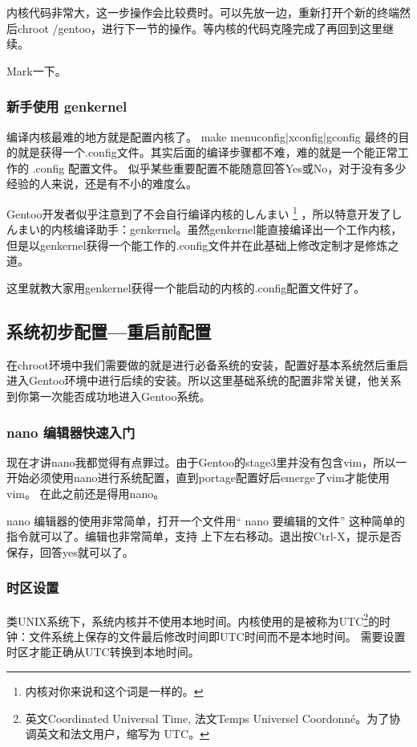 \documentclass[amstex,twoside]{ctexbook}
\begin{document}
内核代码非常大，这一步操作会比较费时。可以先放一边，重新打开个新的终端然后chroot /gentoo，进行下一节的操作。等内核的代码克隆完成了再回到这里继续。

Mark一下。

\subsubsection{新手使用 genkernel}

编译内核最难的地方就是配置内核了。 make menuconfig|xconfig|gconfig 最终的目的就是获得一个.config文件。其实后面的编译步骤都不难，难的就是一个能正常工作的 .config 配置文件。
似乎某些重要配置不能随意回答Yes或No，对于没有多少经验的人来说，还是有不小的难度么。

Gentoo开发者似乎注意到了不会自行编译内核的しんまい%
\footnote{内核对你来说和这个词是一样的。}%
，所以特意开发了しんまい的内核编译助手：genkernel。虽然genkernel能直接编译出一个工作内核，
但是以genkernel获得一个能工作的.config文件并在此基础上修改定制才是修炼之道。

这里就教大家用genkernel获得一个能启动的内核的.config配置文件好了。


\subsection{系统初步配置—重启前配置}
在chroot环境中我们需要做的就是进行必备系统的安装，配置好基本系统然后重启进入Gentoo环境中进行后续的安装。所以这里基础系统的配置非常关键，他关系到你第一次能否成功地进入Gentoo系统。


\subsubsection{nano 编辑器快速入门}\label{sec:nano}
现在才讲nano我都觉得有点罪过。由于Gentoo的stage3里并没有包含vim，所以一开始必须使用nano进行系统配置，直到portage配置好后emerge了vim才能使用vim。
在此之前还是得用nano。

nano 编辑器的使用非常简单，打开一个文件用“ nano 要编辑的文件” 这种简单的指令就可以了。编辑也非常简单，支持
\textuparrow \textdownarrow \textleftarrow \textrightarrow 上下左右移动。退出按Ctrl-X，提示是否保存，回答yes就可以了。


\subsubsection{时区设置}

类UNIX系统下，系统内核并不使用本地时间。内核使用的是被称为UTC\footnote{英文Coordinated Universal Time, 法文Temps Universel Coordonné。为了协调英文和法文用户，缩写为 UTC。}的时钟：文件系统上保存的文件最后修改时间即UTC时间而不是本地时间。
需要设置时区才能正确从UTC转换到本地时间。
\end{document}
